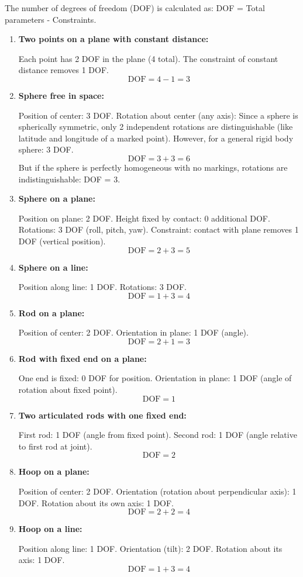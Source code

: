 \documentclass[12pt]{article}
\begin{document}
\begin{correctionbox}
The number of degrees of freedom (DOF) is calculated as: DOF = Total parameters - Constraints.

\begin{enumerate}
    \item \textbf{Two points on a plane with constant distance:}
    
    Each point has 2 DOF in the plane (4 total). The constraint of constant distance removes 1 DOF.
    $$\text{DOF} = 4 - 1 = 3$$
    
    \item \textbf{Sphere free in space:}
    
    Position of center: 3 DOF. Rotation about center (any axis): Since a sphere is spherically symmetric, only 2 independent rotations are distinguishable (like latitude and longitude of a marked point). However, for a general rigid body sphere: 3 DOF.
    $$\text{DOF} = 3 + 3 = 6$$
    But if the sphere is perfectly homogeneous with no markings, rotations are indistinguishable: DOF = 3.
    
    \item \textbf{Sphere on a plane:}
    
    Position on plane: 2 DOF. Height fixed by contact: 0 additional DOF. Rotations: 3 DOF (roll, pitch, yaw). Constraint: contact with plane removes 1 DOF (vertical position).
    $$\text{DOF} = 2 + 3 = 5$$
    
    \item \textbf{Sphere on a line:}
    
    Position along line: 1 DOF. Rotations: 3 DOF.
    $$\text{DOF} = 1 + 3 = 4$$
    
    \item \textbf{Rod on a plane:}
    
    Position of center: 2 DOF. Orientation in plane: 1 DOF (angle).
    $$\text{DOF} = 2 + 1 = 3$$
    
    \item \textbf{Rod with fixed end on a plane:}
    
    One end is fixed: 0 DOF for position. Orientation in plane: 1 DOF (angle of rotation about fixed point).
    $$\text{DOF} = 1$$
    
    \item \textbf{Two articulated rods with one fixed end:}
    
    First rod: 1 DOF (angle from fixed point). Second rod: 1 DOF (angle relative to first rod at joint).
    $$\text{DOF} = 2$$
    
    \item \textbf{Hoop on a plane:}
    
    Position of center: 2 DOF. Orientation (rotation about perpendicular axis): 1 DOF. Rotation about its own axis: 1 DOF.
    $$\text{DOF} = 2 + 2 = 4$$
    
    \item \textbf{Hoop on a line:}
    
    Position along line: 1 DOF. Orientation (tilt): 2 DOF. Rotation about its axis: 1 DOF.
    $$\text{DOF} = 1 + 3 = 4$$
\end{enumerate}
\end{correctionbox}
\end{document}

